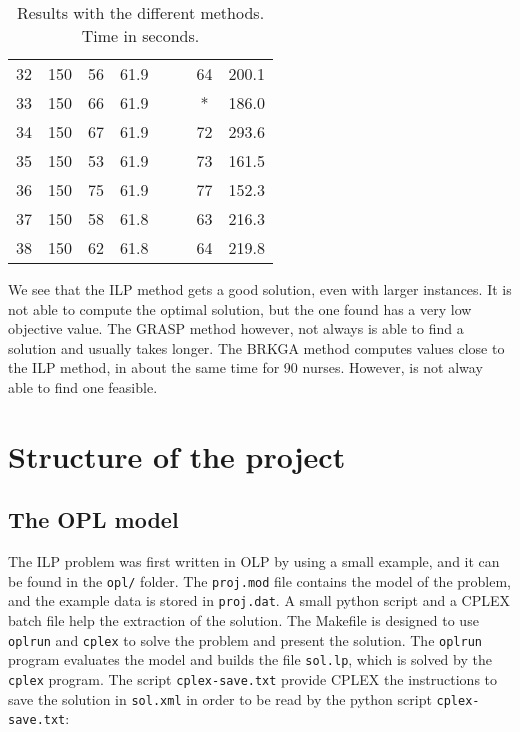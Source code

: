 \documentclass[12pt,a4paper]{article}
\begin{document}
\begin{table}[ht]
\begin{tabular}{cccccccc}
	32 &    150 &  56  & 61.9 &      &       &  64  & 200.1 \\
	33 &    150 &  66  & 61.9 &      &       &   *  & 186.0 \\
	34 &    150 &  67  & 61.9 &      &       &  72  & 293.6 \\
	35 &    150 &  53  & 61.9 &      &       &  73  & 161.5 \\
	36 &    150 &  75  & 61.9 &      &       &  77  & 152.3 \\
	37 &    150 &  58  & 61.8 &      &       &  63  & 216.3 \\
	38 &    150 &  62  & 61.8 &      &       &  64  & 219.8 \\
\bottomrule
\end{tabular}
\caption{Results with the different methods. Time in seconds.}
\label{tab:results}
\end{table}

We see that the ILP method gets a good solution, even with larger instances. It 
is not able to compute the optimal solution, but the one found has a very low 
objective value. The GRASP method however, not always is able to find a solution 
and usually takes longer. The BRKGA method computes values close to the ILP 
method, in about the same time for 90 nurses. However, is not alway able to find 
one feasible.

\section{Structure of the project}

\subsection{The OPL model}

The ILP problem was first written in OLP by using a small example, and it can be 
found in the \texttt{opl/} folder. The \texttt{proj.mod} file contains the model 
of the problem, and the example data is stored in \texttt{proj.dat}. A small 
python script and a CPLEX batch file help the extraction of the solution. The 
Makefile is designed to use \texttt{oplrun} and \texttt{cplex} to solve the 
problem and present the solution. The \texttt{oplrun} program evaluates the 
model and builds the file \texttt{sol.lp}, which is solved by the \texttt{cplex} 
program. The script \texttt{cplex-save.txt} provide CPLEX the instructions to 
save the solution in \texttt{sol.xml} in order to be read by the python script 
\texttt{cplex-save.txt}:
\end{document}
